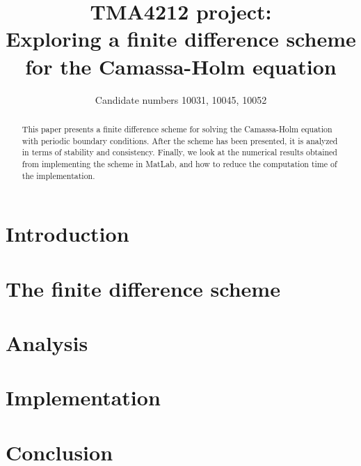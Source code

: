 \documentclass{article}
\title{TMA4212 project: \\ Exploring a finite difference scheme for the Camassa-Holm equation}
\author{Candidate numbers 10031, 10045, 10052}
\begin{document}
\maketitle

\begin{abstract}
This paper presents a finite difference scheme for solving the Camassa-Holm equation with periodic boundary conditions. After the  scheme has been presented, it is analyzed in terms of stability and consistency. Finally, we look at the numerical results obtained from implementing the scheme in MatLab, and how to reduce the computation time of the implementation.
\end{abstract}
	

\section*{Introduction}


\newpage

\section*{The finite difference scheme}



%

\newpage

\section*{Analysis}



\section*{Implementation}


\section*{Conclusion}



{}

\end{document}
